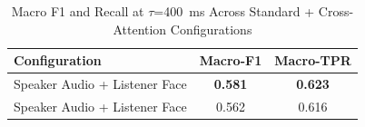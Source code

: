 \begin{table}[h]
\caption{Macro F1 and Recall at $\tau$=400~ms Across Standard + Cross-Attention Configurations}
\label{tab:macro_sca}
\small
\renewcommand{\arraystretch}{1.20}
\begin{tabular}{>{\raggedright\arraybackslash}p{4cm}cc}
\toprule
Configuration & Macro-F1 & Macro-TPR \\
\midrule
Speaker Audio + Listener Face & \textbf{0.581} & \textbf{0.623} \\
Speaker Audio + Listener Face & 0.562 & 0.616 \\
\bottomrule
\end{tabular}
\end{table}
